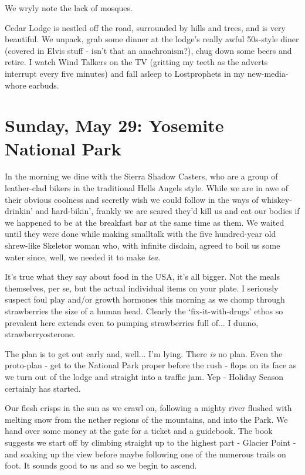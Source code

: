 \documentclass[a5paper,titlepage,11pt]{book}
\begin{document}
We wryly note the lack of mosques.

Cedar Lodge is nestled off the road, surrounded by hills and trees, and is very beautiful.  We unpack, grab some dinner at the lodge's really awful 50s-style diner (covered in Elvis stuff - isn't that an anachronism?), chug down some beers and retire.  I watch Wind Talkers on the TV (gritting my teeth as the adverts interrupt every five minutes) and fall asleep to Lostprophets in my new-media-whore earbuds.

\chapter[Yosemite National Park]{Sunday, May 29: Yosemite National Park}
In the morning we dine with the Sierra Shadow Casters, who are a group of leather-clad bikers in the traditional Hells Angels style.  While we are in awe of their obvious coolness and secretly wish we could follow in the ways of whiskey-drinkin' and hard-bikin', frankly we are scared they'd kill us and eat our bodies if we happened to be at the breakfast bar at the same time as them.  We waited until they were done while making smalltalk with the five hundred-year old shrew-like Skeletor woman who, with infinite disdain, agreed to boil us some water since, well, we needed it to make \emph{tea}.

It's true what they say about food in the USA, it's all bigger.  Not the meals themselves, per se, but the actual individual items on your plate. I seriously suspect foul play and/or growth hormones this morning as we chomp through strawberries the size of a human head.  Clearly the `fix-it-with-drugs' ethos so prevalent here extends even to pumping strawberries full of... I dunno, strawberryosterone.

The plan is to get out early and, well... I'm lying.  There \emph{is} no plan.  Even the proto-plan - get to the National Park proper before the rush - flops on its face as we turn out of the lodge and straight into a traffic jam.  Yep - Holiday Season certainly has started.

Our flesh crisps in the sun as we crawl on, following a mighty river flushed with melting snow from the nether regions of the mountains, and into the Park.  We hand over some money at the gate for a ticket and a guidebook.  The book suggests we start off by climbing straight up to the highest part - Glacier Point - and soaking up the view before maybe following one of the numerous trails on foot.  It sounds good to us and so we begin to ascend.
\end{document}
